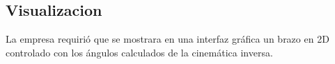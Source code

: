 \subsection{Visualizacion}

La empresa requirió que se mostrara en una interfaz gráfica un brazo en 2D controlado con los ángulos calculados de la cinemática inversa.